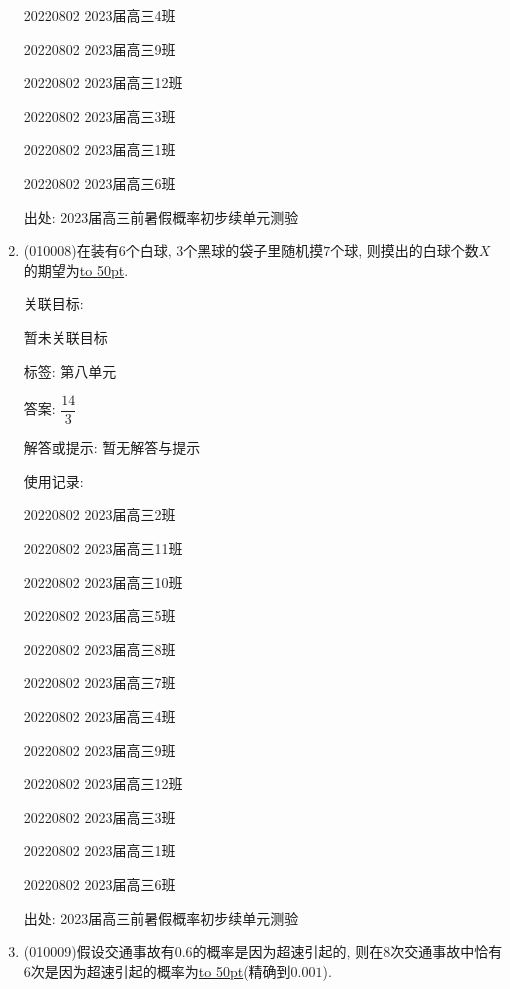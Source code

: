 \documentclass[10pt,a4paper]{article}
\newcommand{\blank}[1]{\underline{\hbox to #1pt{}}}
\begin{document}
\begin{enumerate}[1.]
20220802	2023届高三4班	

20220802	2023届高三9班	

20220802	2023届高三12班	

20220802	2023届高三3班	

20220802	2023届高三1班	

20220802	2023届高三6班	


出处: 2023届高三前暑假概率初步续单元测验
\item { (010008)}在装有$6$个白球, $3$个黑球的袋子里随机摸$7$个球, 则摸出的白球个数$X$的期望为\blank{50}.


关联目标:

暂未关联目标



标签: 第八单元

答案: $\dfrac {14}3$

解答或提示: 暂无解答与提示

使用记录:

20220802	2023届高三2班	

20220802	2023届高三11班	

20220802	2023届高三10班	

20220802	2023届高三5班	

20220802	2023届高三8班	

20220802	2023届高三7班	

20220802	2023届高三4班	

20220802	2023届高三9班	

20220802	2023届高三12班	

20220802	2023届高三3班	

20220802	2023届高三1班	

20220802	2023届高三6班	


出处: 2023届高三前暑假概率初步续单元测验
\item { (010009)}假设交通事故有$0.6$的概率是因为超速引起的, 则在$8$次交通事故中恰有$6$次是因为超速引起的概率为\blank{50}(精确到$0.001$).



\end{enumerate}
\end{document}
